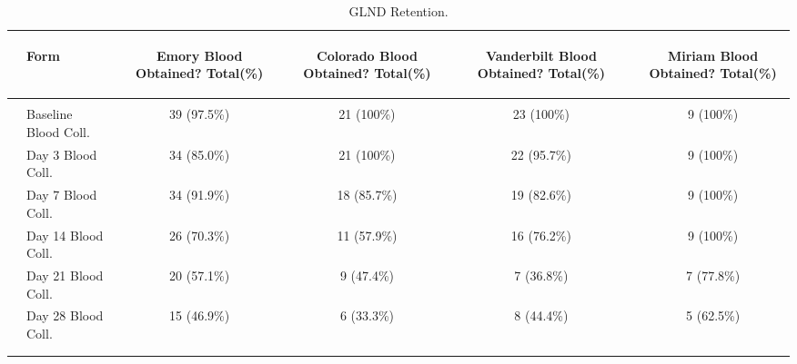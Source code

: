 \documentclass[dvips,10pt]{article}
\begin{document}
\begin{table}[t]
\caption
{ GLND Retention. }
\begin{center}
\begin{tabular}{ @{}l@{}
@{}l@{}@{}p{1.5em}@{}@{}c@{}@{}p{1.5em}@{}@{}c@{}@{}p{1.5em}@{}@{}c@{}@{}p{1.5em}@{}@{}c@{}
}
\hline

& \parbox{6em}{\begin{center}Form\end{center}} && \parbox{6em}{\begin{center}Emory Blood Obtained? Total(\%)\end{center}} && \parbox{6em}{\begin{center}Colorado Blood Obtained? Total(\%)\end{center}} && \parbox{6em}{\begin{center}Vanderbilt Blood Obtained? Total(\%)\end{center}} && \parbox{6em}{\begin{center}Miriam Blood Obtained? Total(\%)\end{center}} \\

\hline

\\
& Baseline Blood Coll. && 39 (97.5\%) && 21 (100\%) && 23 (100\%) && 9 (100\%) \\
& Day 3 Blood Coll. && 34 (85.0\%) && 21 (100\%) && 22 (95.7\%) && 9 (100\%) \\
& Day 7 Blood Coll. && 34 (91.9\%) && 18 (85.7\%) && 19 (82.6\%) && 9 (100\%) \\
& Day 14 Blood Coll. && 26 (70.3\%) && 11 (57.9\%) && 16 (76.2\%) && 9 (100\%) \\
& Day 21 Blood Coll. && 20 (57.1\%) && 9 (47.4\%) && 7 (36.8\%) && 7 (77.8\%) \\
& Day 28 Blood Coll. && 15 (46.9\%) && 6 (33.3\%) && 8 (44.4\%) && 5 (62.5\%) \\
\\
\hline \\

\end{tabular}

\end{center}
 \end{table}
\end{document}

